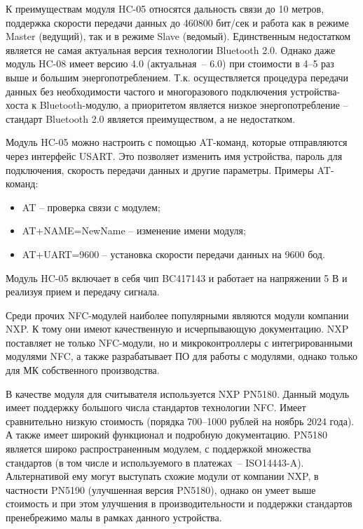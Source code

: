 К преимуществам модуля HC-05 относятся дальность связи до 10 метров, поддержка скорости передачи данных до 460800 бит/сек и работа как в режиме Master (ведущий), так и в режиме Slave (ведомый).
Единственным недостатком является не самая актуальная версия технологии Bluetooth 2.0.
Однако даже модуль HC-08 имеет версию 4.0 (актуальная~-- 6.0) при стоимости в 4--5 раз выше и большим энергопотреблением.
Т.к. осуществляется процедура передачи данных без необходимости частого и многоразового подключения устройства-хоста к Bluetooth-модулю, а приоритетом является низкое энергопотребление – стандарт Bluetooth 2.0 является преимуществом, а не недостатком.

Модуль HC-05 можно настроить с помощью AT-команд, которые отправляются через интерфейс USART.
Это позволяет изменить имя устройства, пароль для подключения, скорость передачи данных и другие параметры.
Примеры AT-команд:

\begin{itemize}
    \item AT – проверка связи с модулем;
    \item AT+NAME=NewName – изменение имени модуля;
    \item AT+UART=9600 – установка скорости передачи данных на 9600 бод.
\end{itemize}

Модуль HC-05 включает в себя чип BC417143 и работает на напряжении 5 В и реализуя прием и передачу сигнала.


Среди прочих NFC-модулей наиболее популярными являются модули компании NXP.
К тому они имеют качественную и исчерпывающую документацию.
NXP поставляет не только NFC-модули, но и микроконтроллеры с интегрированными модулями NFC, а также разрабатывает ПО для работы с модулями, однако только для МК собственного производства.

В качестве модуля для считывателя используется NXP PN5180.
Данный модуль имеет поддержку большого числа стандартов технологии NFC.
Имеет сравнительно низкую стоимость (порядка 700--1000 рублей на ноябрь 2024 года).
А также имеет широкий функционал и подробную документацию.
PN5180 является широко распространенным модулем, с поддержкой множества стандартов (в том числе и используемого в платежах~-- ISO14443-A).
Альтернативой ему могут выступать схожие модули от компании NXP, в частности PN5190 (улучшенная версия PN5180), однако он умеет выше стоимость и при этом улучшения в производительности и поддержки стандартов пренебрежимо малы в рамках данного устройства.

